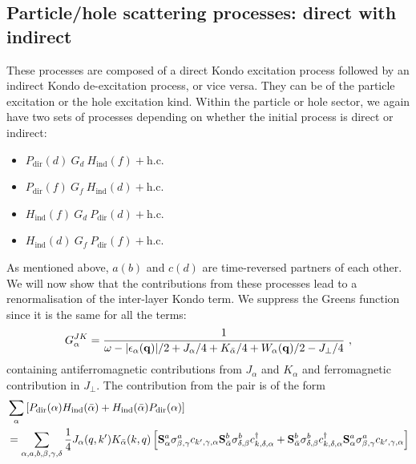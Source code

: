 \documentclass[%
reprint,
superscriptaddress,
groupedaddress,
superscriptaddress,
onecolumn,
10pt
]{revtex4-2}
\begin{document}
\subsection{Particle/hole scattering processes: direct with indirect}
These processes are composed of a direct Kondo excitation process followed by an indirect Kondo de-excitation process, or vice versa. They can be of the particle excitation or the hole excitation kind. Within the particle or hole sector, we again have two sets of processes depending on whether the initial process is direct or indirect:
\begin{itemize}
	\item[a.] \(P_\text{dir}(d)~G_{d}~H_\text{ind}(f) + \text{h.c.}\)
	\item[b.] \(P_\text{dir}(f)~G_{f}~H_\text{ind}(d) + \text{h.c.}\)
	\item[c.] \(H_\text{ind}(f)~G_{d}~P_\text{dir}(d) + \text{h.c.}\)
	\item[d.] \(H_\text{ind}(d)~G_{f}~P_\text{dir}(f) + \text{h.c.}\)
\end{itemize}
As mentioned above, \(a (b)\) and \(c (d)\) are time-reversed partners of each other. We will now show that the contributions from these processes lead to a renormalisation of the inter-layer Kondo term. We suppress the Greens function since it is the same for all the terms:
\begin{equation}\begin{aligned}
	G^{JK}_\alpha = \frac{1}{\omega - |\epsilon_\alpha({\bf q})| / 2 + J_\alpha/4 + K_{\bar\alpha}/4 + W_\alpha({\bf q})/2 - J_\perp / 4}~,
\end{aligned}\end{equation}
containing antiferromagnetic contributions from \(J_\alpha\) and \(K_\alpha\) and ferromagnetic contribution in \(J_\perp\).
The contribution from the pair is of the form
\begin{equation}\begin{aligned}
	&\sum_\alpha \left[P_\text{dir}(\alpha)H_\text{ind}(\bar\alpha) + H_\text{ind}(\bar\alpha)P_\text{dir}(\alpha)\right] \\
	&= \sum_{\alpha, a, b, \beta, \gamma, \delta}\frac{1}{4}J_\alpha(q, k^\prime) K_{\bar\alpha}(k, q)  \left[{\bf S}^a_\alpha \sigma^a_{\beta,\gamma} c_{k^\prime,\gamma,\alpha} {\bf S}^b_{\bar\alpha}\sigma^b_{\delta, \beta} c^\dagger_{k,\delta,\alpha} + {\bf S}^b_{\bar\alpha}\sigma^b_{\delta, \beta} c^\dagger_{k,\delta,\alpha}{\bf S}^a_\alpha \sigma^a_{\beta,\gamma} c_{k^\prime,\gamma,\alpha} \right]\\
\end{aligned}\end{equation}
\end{document}
